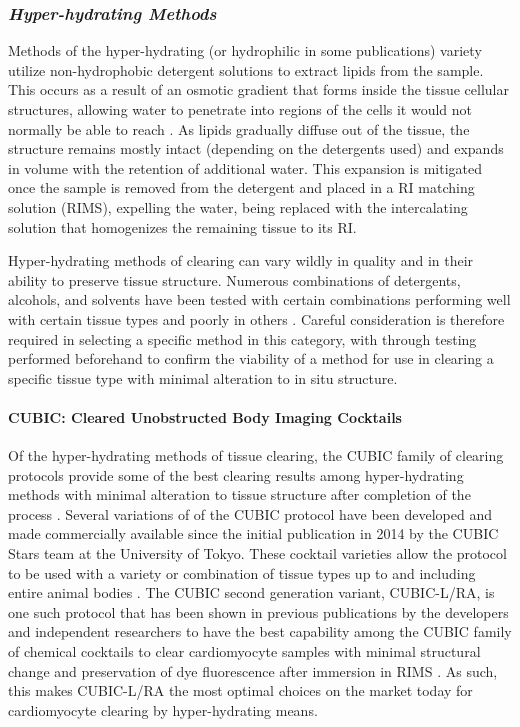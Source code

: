 \subsubsection{\textit{Hyper-hydrating Methods}}
Methods of the hyper-hydrating (or hydrophilic in some publications) variety utilize non-hydrophobic detergent solutions to extract lipids from the sample. This occurs as a result of an osmotic gradient that forms inside the tissue cellular structures, allowing water to penetrate into regions of the cells it would not normally be able to reach \cite{paysan_art_2023}. As lipids gradually diffuse out of the tissue, the structure remains mostly intact (depending on the detergents used) and expands in volume with the retention of additional water. This expansion is mitigated once the sample is removed from the detergent and placed in a RI matching solution (RIMS), expelling the water, being replaced with the intercalating solution that homogenizes the remaining tissue to its RI.

Hyper-hydrating methods of clearing can vary wildly in quality and in their ability to preserve tissue structure. Numerous combinations of detergents, alcohols, and solvents have been tested with certain combinations performing well with certain tissue types and poorly in others \cite{paysan_art_2023, olianti_optical_2021, susaki_whole-brain_2014}. Careful consideration is therefore required in selecting a specific method in this category, with through testing performed beforehand to confirm the viability of a method for use in clearing a specific tissue type with minimal alteration to in situ structure. 

\paragraph{CUBIC: Cleared Unobstructed Body Imaging Cocktails}
Of the hyper-hydrating methods of tissue clearing, the CUBIC family of clearing protocols provide some of the best clearing results among hyper-hydrating methods with minimal alteration to tissue structure after completion of the process \cite{susaki_whole-brain_2014, tainaka_chemical_2018}. Several variations of of the CUBIC protocol have been developed and made commercially available since the initial publication in 2014 by the CUBIC Stars team at the University of Tokyo. These cocktail varieties allow the protocol to be used with a variety or combination of tissue types up to and including entire animal bodies \cite{noauthor_cubic_nodate}. The CUBIC second generation variant, CUBIC-L/RA, is one such protocol that has been shown in previous publications by the developers and independent researchers to have the best capability among the CUBIC family of chemical cocktails to clear cardiomyocyte samples with minimal structural change and preservation of dye fluorescence after immersion in RIMS \cite{tainaka_chemical_2018}. As such, this makes CUBIC-L/RA the most optimal choices on the market today for cardiomyocyte clearing by hyper-hydrating means. 

